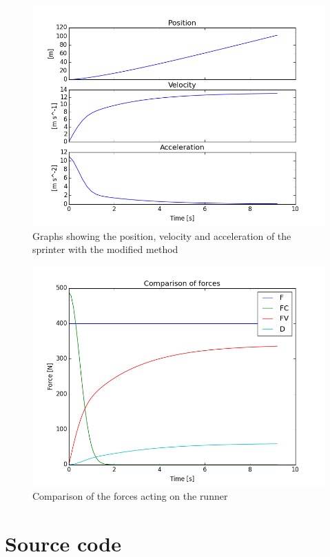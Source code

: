 \documentclass[a4paper,10pt,english]{article}
\begin{document}
\begin{figure}[H]
        \centering 
        \includegraphics[scale=0.8]{i.png} 
        \caption{Graphs showing the position, velocity and acceleration of the sprinter with the modified method}
        \label{fig:i}
\end{figure}

\begin{figure}[H]
        \centering 
        \includegraphics[scale=0.8]{k.png} 
        \caption{Comparison of the forces acting on the runner}
        \label{fig:k}
\end{figure}


\section{Source code}

\end{document}
